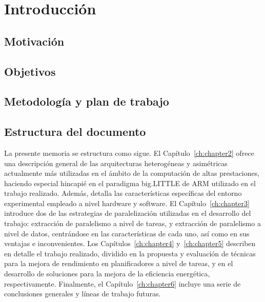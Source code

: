 \cleardoublepage


\chapter{Introducción}
\label{ch:chapter1}

\section{Motivación}

\section{Objetivos}

\section{Metodología y plan de trabajo}

\section{Estructura del documento}

La presente memoria se estructura como sigue. 
El Capítulo~\ref{ch:chapter2} ofrece una descripción general de las arquitecturas heterogéneas
y asimétricas actualmente más utilizadas en el ámbito de la computación de altas prestaciones,
haciendo especial hincapié en el paradigma big.LITTLE de ARM utilizado en el trabajo realizado. Además,
detalla las características específicas del entorno experimental empleado a nivel hardware y software.
El Capítulo~\ref{ch:chapter3} introduce dos de las estrategias de paralelización utilizadas en el
desarrollo del trabajo: extracción de paralelismo a nivel de tareas, y extracción de paralelismo
a nivel de datos, centrándose en las características de cada uno, así como en sus ventajas e inconvenientes.
Los Capítulos~\ref{ch:chapter4} y~\ref{ch:chapter5} describen en detalle el trabajo realizado, dividido
en la propuesta y evaluación de técnicas para la mejora de rendimiento en planificadores a nivel de tareas,
y en el desarrollo de soluciones para la mejora de la eficiencia energética, respectivamente.
Finalmente, el Capítulo~\ref{ch:chapter6} incluye una serie de conclusiones generales y líneas
de trabajo futuras.



